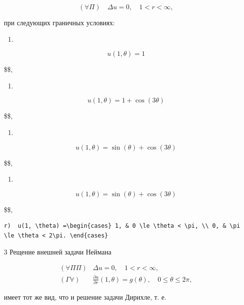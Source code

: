 \documentclass[
  ukrainian,
]{article}
\providecommand{\tightlist}{%
  \setlength{\itemsep}{0pt}\setlength{\parskip}{0pt}}
\begin{document}
\[
(\forall \Pi) \quad \Delta u = 0, \quad 1 < r < \infty,
\]

при следующих граничных условиях:

\begin{enumerate}
\def\labelenumi{\alph{enumi})}
\tightlist
\item
\end{enumerate}

\[
u(1, \theta) = 1
\]

\$\$,

\begin{enumerate}
\def\labelenumi{\arabic{enumi})}
\setcounter{enumi}{5}
\tightlist
\item
\end{enumerate}

\[
u(1, \theta) = 1 + \cos(3\theta)
\]

\$\$,

\begin{enumerate}
\def\labelenumi{\Alph{enumi})}
\setcounter{enumi}{1}
\tightlist
\item
\end{enumerate}

\[
u(1, \theta) = \sin(\theta) + \cos(3\theta)
\]

\$\$,

\begin{enumerate}
\def\labelenumi{\Alph{enumi})}
\setcounter{enumi}{1}
\tightlist
\item
\end{enumerate}

\[
u(1, \theta) = \sin(\theta) + \cos(3\theta)
\]

\$\$,

\begin{verbatim}
r)  u(1, \theta) =\begin{cases} 1, & 0 \le \theta < \pi, \\ 0, & \pi \le \theta < 2\pi. \end{cases}
\end{verbatim}

3 Рещение внешней задачи Неймана

\[
\begin{array}{ll} (\forall \Pi \Pi) & \Delta u = 0, \quad 1 < r < \infty, \\ (\Gamma \forall) & \frac{\partial u}{\partial r} (1, \theta) = g(\theta), \quad 0 \leqslant \theta \leqslant 2\pi, \end{array}
\]

имеет тот же вид, что и решение задачи Дирихле, т. е.
\end{document}

